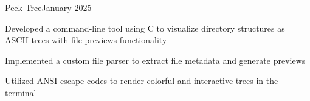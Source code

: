 \begin{resume_subsection}{Peek Tree}{January 2025}
    \begin{subitems}
        \item Developed a command-line tool using C to visualize directory structures as ASCII trees with file previews functionality
        \item Implemented a custom file parser to extract file metadata and generate previews
        \item Utilized ANSI escape codes to render colorful and interactive trees in the terminal
    \end{subitems}
\end{resume_subsection}

